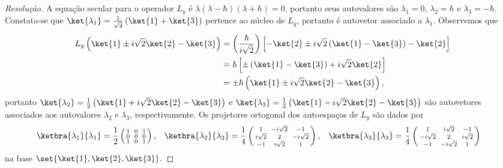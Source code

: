 \begin{proof}[Resolução]
    A equação secular para o operador \(L_y\) é \(\lambda(\lambda - \hbar)(\lambda+\hbar) = 0\), portanto seus autovalores são \(\lambda_1 = 0\), \(\lambda_2 = \hbar\) e \(\lambda_3 = -\hbar\). Constata-se que \(\ket{\lambda_1} = \frac{1}{\sqrt{2}} \left(\ket{1} + \ket{3}\right)\) pertence ao núcleo de \(L_y\), portanto é autovetor associado a \(\lambda_1\). Observemos que
    \begin{align*}
        L_y\left(\ket{1} \pm i\sqrt{2} \ket{2} - \ket{3}\right)
        &= \left(\frac{\hbar}{i\sqrt{2}}\right)\left[-\ket{2} \pm i\sqrt{2} \left(\ket{1} - \ket{3}\right) - \ket{2}\right]\\
        &= \hbar \left[\pm \left(\ket{1} - \ket{3}\right) + i\sqrt{2}\ket{2}\right]\\
        &= \pm\hbar \left(\ket{1} \pm i\sqrt{2}\ket{2} - \ket{3}\right),
    \end{align*}
    portanto \(\ket{\lambda_2} = \frac{1}{2}\left(\ket{1} + i\sqrt{2}\ket{2} - \ket{3}\right)\) e \(\ket{\lambda_3} = \frac12 \left(\ket{1} - i\sqrt{2} \ket{2} - \ket{3}\right)\) são autovetores associados aos autovalores \(\lambda_2\) e \(\lambda_3\), respectivamente. Os projetores ortogonal dos autoespaços de \(L_y\) são dados por
    \begin{align*}
        \ketbra{\lambda_1}{\lambda_1} &= \frac12 \left(\begin{smallmatrix}
            1 && 0 && 1\\
            0 && 0 && 0\\
            1 && 0 && 1
        \end{smallmatrix}\right),&
        \ketbra{\lambda_2}{\lambda_2} &= \frac14 \left(\begin{smallmatrix}
            1 && -i\sqrt{2} && -1\\
            i\sqrt{2} && 2 && -i\sqrt{2}\\
            -1 && i\sqrt{2} && 1
        \end{smallmatrix}\right),&
        \ketbra{\lambda_3}{\lambda_3} &= \frac14 \left(\begin{smallmatrix}
            1 && i\sqrt{2} && -1\\
            -i\sqrt{2} && 2 && i\sqrt{2}\\
            -1 && -i\sqrt{2} && 1
        \end{smallmatrix}\right)
    \end{align*}
    na base \(\set{\ket{1}, \ket{2}, \ket{3}}.\)
\end{proof}
